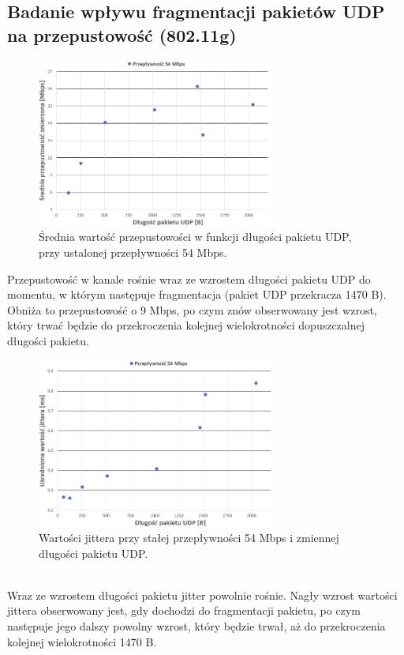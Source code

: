 \documentclass[12pt, a4paper, oneside]{article}
\begin{document}
\subsection{Badanie wpływu fragmentacji pakietów UDP na przepustowość (802.11g)}
\begin{figure}[h!]
\centering
\includegraphics[width=0.7\textwidth]{pics/f7.png}
\caption{Średnia wartość przepustowości w funkcji długości pakietu UDP, przy ustalonej przepływności 54 Mbps.}
\end{figure}
\indent Przepustowość w kanale rośnie wraz ze wzrostem długości pakietu UDP do momentu, w którym następuje fragmentacja (pakiet UDP przekracza 1470 B). Obniża to przepustowość o 9 Mbps, po czym znów obserwowany jest wzrost, który trwać będzie do przekroczenia kolejnej wielokrotności dopuszczalnej długości pakietu.
\begin{figure}[h!]
\centering
\includegraphics[width=0.7\textwidth]{pics/f8.png}
\caption{Wartości jittera przy stałej przepływności 54 Mbps i zmiennej długości pakietu UDP.}
\end{figure}\\
\indent Wraz ze wzrostem długości pakietu jitter powolnie rośnie. Nagły wzrost wartości jittera obserwowany jest, gdy dochodzi do fragmentacji pakietu, po czym następuje jego dalszy powolny wzrost, który będzie trwał, aż do przekroczenia kolejnej wielokrotności 1470 B.
\clearpage
\end{document}
